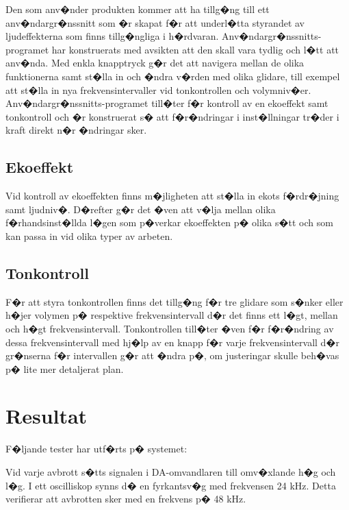 \documentclass[a4paper]{article}
\begin{document}
Den som anv�nder produkten kommer att ha tillg�ng till ett anv�ndargr�nssnitt som �r skapat f�r att underl�tta styrandet av ljudeffekterna som finns tillg�ngliga i h�rdvaran. Anv�ndargr�nssnitts-programet har konstruerats med avsikten att den skall vara tydlig och l�tt att anv�nda. Med enkla knapptryck g�r det att navigera mellan de olika funktionerna samt st�lla in och �ndra v�rden med olika glidare, till exempel att st�lla in nya frekvensintervaller vid tonkontrollen och volymniv�er. Anv�ndargr�nssnitts-programet till�ter f�r kontroll av en ekoeffekt samt tonkontroll och �r konstruerat s� att f�r�ndringar i inst�llningar tr�der i kraft direkt n�r �ndringar sker.

\subsection{Ekoeffekt}
Vid kontroll av ekoeffekten finns m�jligheten att st�lla in ekots f�rdr�jning samt ljudniv�. D�refter g�r det �ven att v�lja mellan olika f�rhandsinst�llda l�gen som p�verkar ekoeffekten p� olika s�tt och som kan passa in vid olika typer av arbeten.

\subsection{Tonkontroll}
F�r att styra tonkontrollen finns det tillg�ng f�r tre glidare som s�nker eller h�jer volymen p� respektive frekvensintervall d�r det finns ett l�gt, mellan och h�gt frekvensintervall. Tonkontrollen till�ter �ven f�r f�r�ndring av dessa frekvensintervall med hj�lp av en knapp f�r varje frekvensintervall d�r gr�nserna f�r intervallen g�r att �ndra p�, om justeringar skulle beh�vas p� lite mer detaljerat plan.

\section{Resultat}
F�ljande tester har utf�rts p� systemet:

Vid varje avbrott s�tts signalen i DA-omvandlaren till omv�xlande h�g och l�g. I ett oscilliskop synns d� en fyrkantsv�g med frekvensen 24 kHz. Detta verifierar att avbrotten sker med en frekvens p� 48 kHz.
\end{document}
